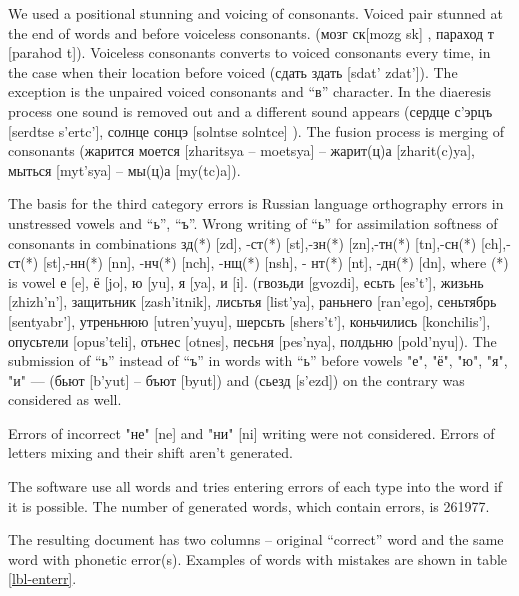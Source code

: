 \documentclass[conference,a4paper]{IEEEtran}
\begin{document}
We used a positional stunning and voicing of consonants. Voiced pair stunned at the end of words and before voiceless consonants. (мозг {ск}[mozg {sk}] , параход {т} [parahod {t}]). Voiceless consonants converts to voiced consonants every time, in the case when their location before voiced (сдать {здать} [sdat’ {zdat’}]). The exception is the unpaired voiced consonants and “в” character. In the diaeresis process one sound is removed out and a different sound appears (сердце {с'эрцъ} [serdtse {s’ertc’}], солнце {сонцэ} [solntse {solntce}] ). The fusion process is merging of consonants (жарится моется [zharitsya – moetsya] – жарит(ц)а [zharit(c)ya], мыться [myt’sya] – мы(ц)а [my(tc)a]).

The basis for the third category errors is Russian language orthography errors in unstressed vowels and “ь”, “ъ”.
Wrong writing of “ь” for assimilation softness of consonants in combinations зд(*) [zd], -ст(*) [st],-зн(*) [zn],-тн(*) [tn],-сн(*) [ch],-ст(*) [st],-нн(*) [nn], -нч(*) [nch], -нщ(*) [nsh], - нт(*) [nt], -дн(*) [dn], where (*) is vowel е [e], ё [jo], ю [yu], я [ya], и [i]. (гвозьди [gvozdi], есьть [es’t’], жизьнь [zhizh’n’], защитьник [zash’itnik], лисьтья [list’ya], раньнего [ran’ego], сеньтябрь [sentyabr’], утреньнюю [utren’yuyu],  шерсьть [shers’t’], коньчились [konchilis’], опусьтели [opus’teli], отьнес [otnes], песьня [pes’nya], полдьню [pold’nyu]). The submission of “ь” instead of “ъ” in words with “ь” before vowels "е", "ё", "ю", "я", "и" --- (бьют [b’yut] – бъют [byut]) and (сьезд [s’ezd]) on the contrary was considered as well.

Errors of incorrect "не" [ne] and "ни" [ni] writing were not considered. Errors of letters mixing and their shift aren't generated.

The software use all words and tries entering errors of each type into the word if it is possible. The number of generated words, which contain errors, is 261977.

The resulting document has two columns – original “correct” word and the same word with phonetic error(s). Examples of words with mistakes are shown in table \ref{lbl-enterr}.
\end{document}
